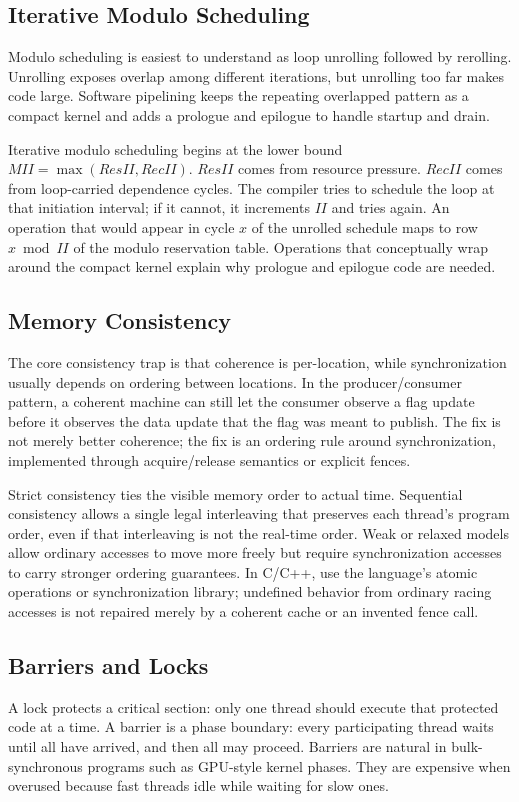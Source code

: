\subsection*{Iterative Modulo Scheduling}
Modulo scheduling is easiest to understand as loop unrolling followed by rerolling.
Unrolling exposes overlap among different iterations, but unrolling too far makes code large.
Software pipelining keeps the repeating overlapped pattern as a compact kernel and adds a prologue and epilogue to handle startup and drain.

Iterative modulo scheduling begins at the lower bound $MII=\max(ResII,RecII)$.
$ResII$ comes from resource pressure.
$RecII$ comes from loop-carried dependence cycles.
The compiler tries to schedule the loop at that initiation interval; if it cannot, it increments $II$ and tries again.
An operation that would appear in cycle $x$ of the unrolled schedule maps to row $x\bmod II$ of the modulo reservation table.
Operations that conceptually wrap around the compact kernel explain why prologue and epilogue code are needed.

\subsection*{Memory Consistency}
The core consistency trap is that coherence is per-location, while synchronization usually depends on ordering between locations.
In the producer/consumer pattern, a coherent machine can still let the consumer observe a flag update before it observes the data update that the flag was meant to publish.
The fix is not merely better coherence; the fix is an ordering rule around synchronization, implemented through acquire/release semantics or explicit fences.

Strict consistency ties the visible memory order to actual time.
Sequential consistency allows a single legal interleaving that preserves each thread's program order, even if that interleaving is not the real-time order.
Weak or relaxed models allow ordinary accesses to move more freely but require synchronization accesses to carry stronger ordering guarantees.
In C/C++, use the language's atomic operations or synchronization library; undefined behavior from ordinary racing accesses is not repaired merely by a coherent cache or an invented fence call.

\subsection*{Barriers and Locks}
A lock protects a critical section: only one thread should execute that protected code at a time.
A barrier is a phase boundary: every participating thread waits until all have arrived, and then all may proceed.
Barriers are natural in bulk-synchronous programs such as GPU-style kernel phases.
They are expensive when overused because fast threads idle while waiting for slow ones.

